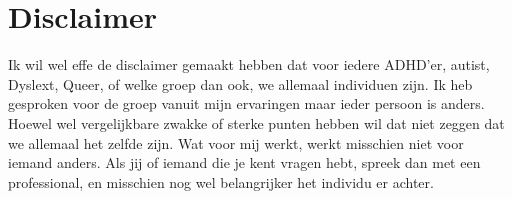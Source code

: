 \documentclass{article}
\begin{document}
    
    \section{Disclaimer}
        Ik wil wel effe de disclaimer gemaakt hebben dat voor iedere ADHD'er, autist, Dyslext, Queer, of welke groep dan ook, we allemaal individuen zijn. Ik heb gesproken voor de groep vanuit mijn ervaringen maar ieder persoon is anders. Hoewel wel vergelijkbare zwakke of sterke punten hebben wil dat niet zeggen dat we allemaal het zelfde zijn. Wat voor mij werkt, werkt misschien niet voor iemand anders. Als jij of iemand die je kent vragen hebt, spreek dan met een professional, en misschien nog wel belangrijker het individu er achter.
    
    
\end{document}

